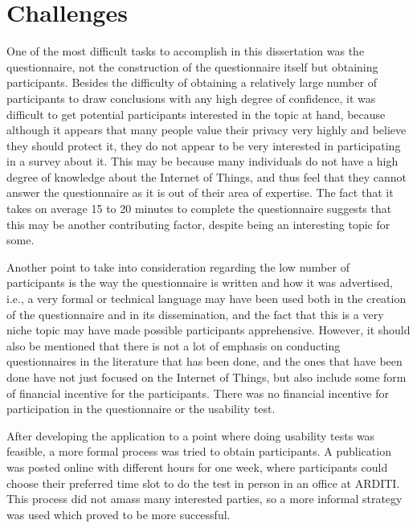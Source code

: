 %
%
\section{Challenges}\label{section:challenges}

One of the most difficult tasks to accomplish in this dissertation was the
questionnaire, not the construction of the questionnaire itself but
obtaining participants. Besides the difficulty of obtaining a relatively
large number of participants to draw conclusions with any high degree of
confidence, it was difficult to get potential participants interested in the topic
at hand, because although it appears that many people value their privacy very
highly and believe they should protect it, they do not appear to be very
interested in participating in a survey about it.
This may be because many individuals do not have a high degree of knowledge
about the Internet of Things, and thus feel that they cannot answer the
questionnaire as it is out of their area of expertise. The fact that
it takes on average 15 to 20 minutes to complete the questionnaire suggests
that this may be another contributing factor, despite being an interesting
topic for some.

Another point to take into consideration regarding the low
number of participants is the way the questionnaire is written and how
it was advertised, i.e., a very formal or technical language may have
been used both in the creation of the questionnaire and in its
dissemination, and the fact that this is a very niche topic may have
made possible participants apprehensive. However, it should also be mentioned
that there is not a lot of emphasis on conducting questionnaires in the
literature that has been done, and the ones that have been done have not
just focused on the Internet of Things, but also include some form of financial
incentive for the participants. There was no financial incentive for
participation in the questionnaire or the usability test.

After developing the application to a point where doing usability tests was
feasible, a more formal process was tried to obtain participants. A
publication was posted online with different hours for one week, where
participants could choose their preferred time slot to do the test
in person in an office at ARDITI. This process did not amass many
interested parties, so a more informal strategy was used which proved
to be more successful.

